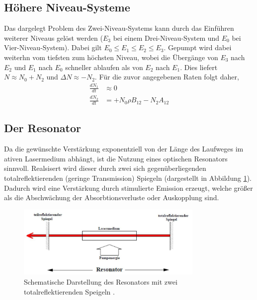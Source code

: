 \subsection{Höhere Niveau-Systeme}
Das dargelegt Problem des Zwei-Niveau-Systems kann durch das Einführen weiterer Niveaus gelöst werden ($E_3$ bei einem Drei-Niveau-System und $E_0$ bei Vier-Niveau-System).
Dabei gilt $E_0\leq E_1 \leq E_2 \leq E_3$. Gepumpt wird dabei weiterhn vom tiefsten zum höchsten Niveau, wobei die Übergänge von $E_3$ nach $E_2$ und $E_1$ nach $E_0$ schneller ablaufen als von $E_2$ nach $E_1$.
Dies liefert $N\approx N_0+N_2$ und $\Delta N \approx -N_2$.
Für die zuvor angegebenen Raten folgt daher,
\begin{align}
    \frac{dN_1}{dt}&\approx 0\\
    \frac{dN_2}{dt}&=+N_0\rho B_{12}-N_2A_{12}
\end{align}

\subsection{Der Resonator}
Da die gewünschte Verstärkung exponentziell von der Länge des Laufweges im ativen Lasermedium abhängt, ist die Nutzung eines optischen Resonators sinnvoll.
Realsisert wird dieser durch zwei sich gegenüberliegenden totalreflektierenden (geringe Transmission) Spiegeln (dargestellt in Abbildung \ref{fig:resonator}).
Dadurch wird eine Verstärkung durch stimulierte Emission erzeugt, welche größer als die Abschwächung der Absorbtionsverluste oder Auskopplung sind.

\begin{figure}
    \center
    \includegraphics[width=0.8\textwidth]{bilder/resonator.jpg}
    \caption{Schematische Darstellung des Resonators mit zwei totalreflektierenden Speigeln \cite{anleitung}.}
    \label{fig:resonator}
\end{figure}

